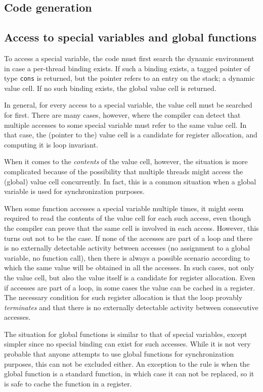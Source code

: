 \subsection{Code generation} 

\subsection{Access to special variables and global functions}

To access a special variable, the code must first search the dynamic
environment in case a per-thread binding exists.  If such a binding
exists, a tagged pointer of type \texttt{cons} is returned, but the
pointer refers to an entry on the stack; a dynamic value cell.  If no
such binding exists, the global value cell is returned.

In general, for every access to a special variable, the value cell
must be searched for first.  There are many cases, however, where the
compiler can detect that multiple accesses to some special variable
must refer to the same value cell.  In that case, the (pointer to the)
value cell is a candidate for register allocation, and computing it is
loop invariant. 

When it comes to the \emph{contents} of the value cell, however, the
situation is more complicated because of the possibility that multiple
threads might access the (global) value cell concurrently.  In fact,
this is a common situation when a global variable is used for
synchronization purposes.

When some function accesses a special variable multiple times, it
might seem required to read the contents of the value cell for each
such access, even though the compiler can prove that the same cell is
involved in each access.  However, this turns out not to be the case.
If none of the accesses are part of a loop and there is no externally
detectable activity between accesses (no assignment to a global
variable, no function call), then there is always a possible scenario
according to which the same value will be obtained in all the
accesses.  In such cases, not only the value cell, but also the value
itself is a candidate for register allocation.  Even if accesses are
part of a loop, in some cases the value can be cached in a register.
The necessary condition for such register allocation is that the loop
provably \emph{terminates} and that there is no externally detectable
activity between consecutive accesses. 

The situation for global functions is similar to that of special
variables, except simpler since no special binding can exist for such
accesses.  While it is not very probable that anyone attempts to use
global functions for synchronization purposes, this can not be
excluded either.  An exception to the rule is when the global function
is a standard \commonlisp{} function, in which case it can not be replaced, so
it is safe to cache the function in a register. 

